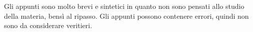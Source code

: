 Gli appunti sono molto brevi e sintetici in quanto non sono pensati allo studio della materia, bensì al ripasso.
Gli appunti possono contenere errori, quindi non sono da considerare veritieri.
